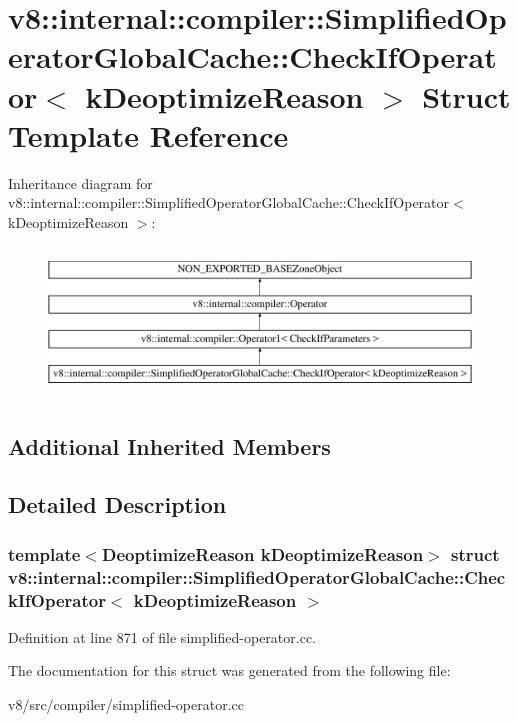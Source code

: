 \hypertarget{structv8_1_1internal_1_1compiler_1_1SimplifiedOperatorGlobalCache_1_1CheckIfOperator}{}\section{v8\+:\+:internal\+:\+:compiler\+:\+:Simplified\+Operator\+Global\+Cache\+:\+:Check\+If\+Operator$<$ k\+Deoptimize\+Reason $>$ Struct Template Reference}
\label{structv8_1_1internal_1_1compiler_1_1SimplifiedOperatorGlobalCache_1_1CheckIfOperator}
Inheritance diagram for v8\+:\+:internal\+:\+:compiler\+:\+:Simplified\+Operator\+Global\+Cache\+:\+:Check\+If\+Operator$<$ k\+Deoptimize\+Reason $>$\+:\begin{figure}[H]
\begin{center}
\leavevmode
\includegraphics[height=4.000000cm]{structv8_1_1internal_1_1compiler_1_1SimplifiedOperatorGlobalCache_1_1CheckIfOperator}
\end{center}
\end{figure}
\subsection*{Additional Inherited Members}


\subsection{Detailed Description}
\subsubsection*{template$<$Deoptimize\+Reason k\+Deoptimize\+Reason$>$\newline
struct v8\+::internal\+::compiler\+::\+Simplified\+Operator\+Global\+Cache\+::\+Check\+If\+Operator$<$ k\+Deoptimize\+Reason $>$}



Definition at line 871 of file simplified-\/operator.\+cc.



The documentation for this struct was generated from the following file\+:\begin{DoxyCompactItemize}
\item 
v8/src/compiler/simplified-\/operator.\+cc\end{DoxyCompactItemize}
